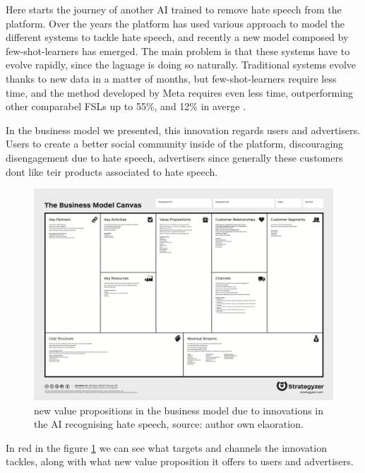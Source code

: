 Here starts the journey of another AI trained to remove hate speech
from the platform. Over the years the platform has used various
approach to model the different systems to tackle hate speech, and
recently a new model composed by few-shot-learners has emerged. The
main problem is that these systems have to evolve rapidly, since the
laguage is doing so naturally. Traditional systems evolve thanks to
new data in a matter of months, but few-shot-learners require less
time, and the method developed by Meta requires even less time,
outperforming other comparabel FSLs up to 55\%, and 12\% in averge
\cite[pp.~5-8]{art:entailing}.

In the business model we presented, this innovation regards users and
advertisers. Users to create a better social community inside of the
platform, discouraging disengagement due to hate speech, advertisers
since generally these customers dont like teir products associated to
hate speech.

\begin{figure}
  \centering
  \includegraphics[width=.8\textwidth]{images/newcanvas}
  \caption{new value propositions in the business model due to
    innovations in the AI recognising hate speech, source: author own
    elaoration.}
  \label{fig:newcanvas}
\end{figure}

In red in the figure \ref{fig:newcanvas} we can see what targets and
channels the innovation tackles, along with what new value proposition
it offers to users and advertisers.
